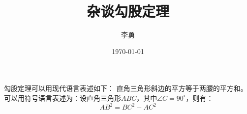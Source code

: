 \documentclass{article} %
\title{\heiti 杂谈勾股定理}
\author{\kaishu 李勇}
\date{\today}
\newcommand{\degree}{^\circ}
\begin{document}
	\maketitle	%
	
	勾股定理可以用现代语言表述如下：
	直角三角形斜边的平方等于两腰的平方和。可以用符号语言表述为：设直角三角形$ABC$，其中$\angle C=90\degree$，则有：
	\begin{equation}	%
		AB^2=BC^2+AC^2 
	\end{equation}
\end{document}
